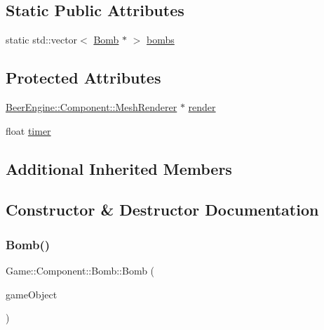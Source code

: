 \subsection*{Static Public Attributes}
\begin{DoxyCompactItemize}
\item 
static std\+::vector$<$ \mbox{\hyperlink{class_game_1_1_component_1_1_bomb}{Bomb}} $\ast$ $>$ \mbox{\hyperlink{class_game_1_1_component_1_1_bomb_a9dc5871647b57df886487e2d936b4dcc}{bombs}}
\end{DoxyCompactItemize}
\subsection*{Protected Attributes}
\begin{DoxyCompactItemize}
\item 
\mbox{\hyperlink{class_beer_engine_1_1_component_1_1_mesh_renderer}{Beer\+Engine\+::\+Component\+::\+Mesh\+Renderer}} $\ast$ \mbox{\hyperlink{class_game_1_1_component_1_1_bomb_ae70ae4cc38793d675183efa64ac25f36}{render}}
\item 
float \mbox{\hyperlink{class_game_1_1_component_1_1_bomb_a4c1dc12e98181874a406edd83b98ffa1}{timer}}
\end{DoxyCompactItemize}
\subsection*{Additional Inherited Members}


\subsection{Constructor \& Destructor Documentation}
\mbox{\label{class_game_1_1_component_1_1_bomb_aed38ca47ddf849382948b02485be41f8}} 
\subsubsection{\texorpdfstring{Bomb()}{Bomb()}}
{\footnotesize\ttfamily Game\+::\+Component\+::\+Bomb\+::\+Bomb (\begin{DoxyParamCaption}\item[{\mbox{\hyperlink{class_beer_engine_1_1_game_object}{Beer\+Engine\+::\+Game\+Object}} $\ast$}]{game\+Object }\end{DoxyParamCaption})}

